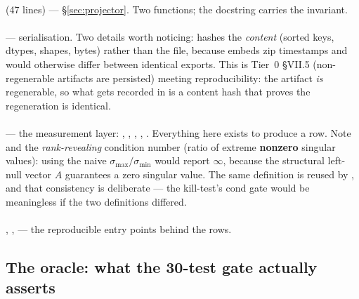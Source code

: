 \paragraph{} (47 lines) --- \S\ref{sec:projector}. Two
functions; the docstring carries the invariant.

\paragraph{} --- serialisation. Two details worth
noticing:  hashes the \emph{content} (sorted keys, dtypes,
shapes, bytes) rather than the file, because  embeds zip timestamps
and would otherwise differ between identical exports. This is Tier~0 \S VII.5
(non-regenerable artifacts are persisted) meeting reproducibility: the artifact
\emph{is} regenerable, so what gets recorded in  is a content
hash that proves the regeneration is identical.

\paragraph{} --- the measurement layer:
, , ,
, . Everything here exists to
produce a  row. Note  and the
\emph{rank-revealing} condition number (ratio of extreme \textbf{nonzero}
singular values): using the naive $\sigma_{\max}/\sigma_{\min}$ would report
$\infty$, because the structural left-null vector $A$ guarantees a zero singular
value. The same definition is reused by ,
and that consistency is deliberate --- the kill-test's cond gate would be
meaningless if the two definitions differed.

\paragraph{},
\textbf{},
\textbf{} --- the reproducible entry points
behind the  rows.

\subsection{The oracle: what the 30-test gate actually asserts}
\label{sec:oracles7}

